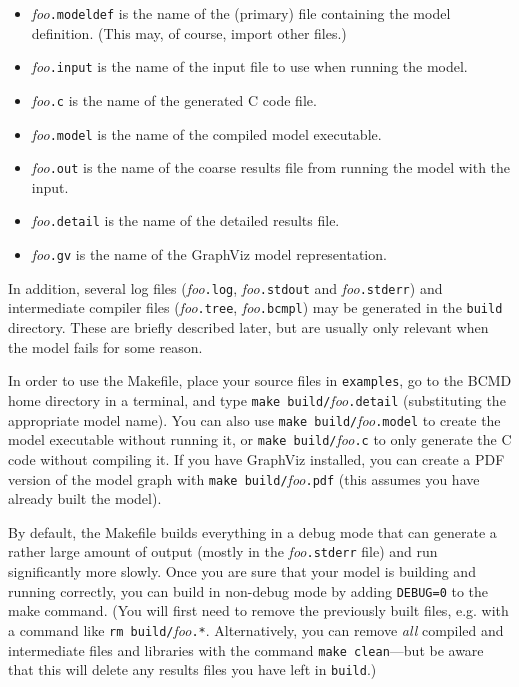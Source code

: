 \documentclass[a4paper,11pt]{article}
\begin{document}
\begin{itemize}
\item \textit{foo}\texttt{.modeldef} is the name of the (primary) file containing the model definition. (This may, of course, import other files.)
\item \textit{foo}\texttt{.input} is the name of the input file to use when running the model.
\item \textit{foo}\texttt{.c} is the name of the generated C code file.
\item \textit{foo}\texttt{.model} is the name of the compiled model executable.
\item \textit{foo}\texttt{.out} is the name of the coarse results file from running the model with the input.
\item \textit{foo}\texttt{.detail} is the name of the detailed results file.
\item \textit{foo}\texttt{.gv} is the name of the GraphViz model representation.
\end{itemize}

In addition, several log files (\textit{foo}\texttt{.log}, \textit{foo}\texttt{.stdout} and \textit{foo}\texttt{.stderr}) and intermediate compiler files (\textit{foo}\texttt{.tree}, \textit{foo}\texttt{.bcmpl}) may be generated in the \texttt{build} directory. These are briefly described later, but are usually only relevant when the model fails for some reason.

In order to use the Makefile, place your source files in \texttt{examples}, go to the BCMD home directory in a terminal, and type \texttt{make build/}\textit{foo}\texttt{.detail} (substituting the appropriate model name). You can also use \texttt{make build/}\textit{foo}\texttt{.model} to create the model executable without running it, or \texttt{make build/}\textit{foo}\texttt{.c} to only generate the C code without compiling it. If you have GraphViz installed, you can create a PDF version of the model graph with \texttt{make build/}\textit{foo}\texttt{.pdf} (this assumes you have already built the model). 

By default, the Makefile builds everything in a debug mode that can generate a rather large amount of output (mostly in the \textit{foo}\texttt{.stderr} file) and run significantly more slowly. Once you are sure that your model is building and running correctly, you can build in non-debug mode by adding \texttt{DEBUG=0} to the make command. (You will first need to remove the previously built files, e.g. with a command like \texttt{rm build/}\textit{foo}\texttt{.*}. Alternatively, you can remove \textit{all} compiled and intermediate files and libraries with the command \texttt{make clean}---but be aware that this will delete any results files you have left in \texttt{build}.)
\end{document}
